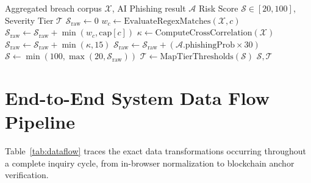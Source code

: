 \documentclass[conference]{IEEEtran}
\begin{document}
\begin{algorithm}[htbp]
\caption{Dynamic Exposure Risk Scoring}
\label{alg:risk}
\begin{algorithmic}[1]
\REQUIRE Aggregated breach corpus $\mathcal{X}$, AI Phishing result $\mathcal{A}$
\ENSURE Risk Score $\mathcal{S} \in [20, 100]$, Severity Tier $\mathcal{T}$
\STATE $\mathcal{S}_{\text{raw}} \leftarrow 0$
    \STATE $w_c \leftarrow \text{EvaluateRegexMatches}(\mathcal{X}, c)$
    \STATE $\mathcal{S}_{\text{raw}} \leftarrow \mathcal{S}_{\text{raw}} + \min(w_c, \text{cap}[c])$
\ENDFOR
\STATE $\kappa \leftarrow \text{ComputeCrossCorrelation}(\mathcal{X})$
\STATE $\mathcal{S}_{\text{raw}} \leftarrow \mathcal{S}_{\text{raw}} + \min(\kappa, 15)$
    \STATE $\mathcal{S}_{\text{raw}} \leftarrow \mathcal{S}_{\text{raw}} + (\mathcal{A}.\text{phishingProb} \times 30)$
\ENDIF
\STATE $\mathcal{S} \leftarrow \min(100, \max(20, \mathcal{S}_{\text{raw}}))$
\STATE $\mathcal{T} \leftarrow \text{MapTierThresholds}(\mathcal{S})$
\RETURN $\mathcal{S}, \mathcal{T}$
\end{algorithmic}
\end{algorithm}

\section{End-to-End System Data Flow Pipeline}
\label{sec:dataflow}
Table~\ref{tab:dataflow} traces the exact data transformations occurring throughout a complete inquiry cycle, from in-browser normalization to blockchain anchor verification.
\end{document}
